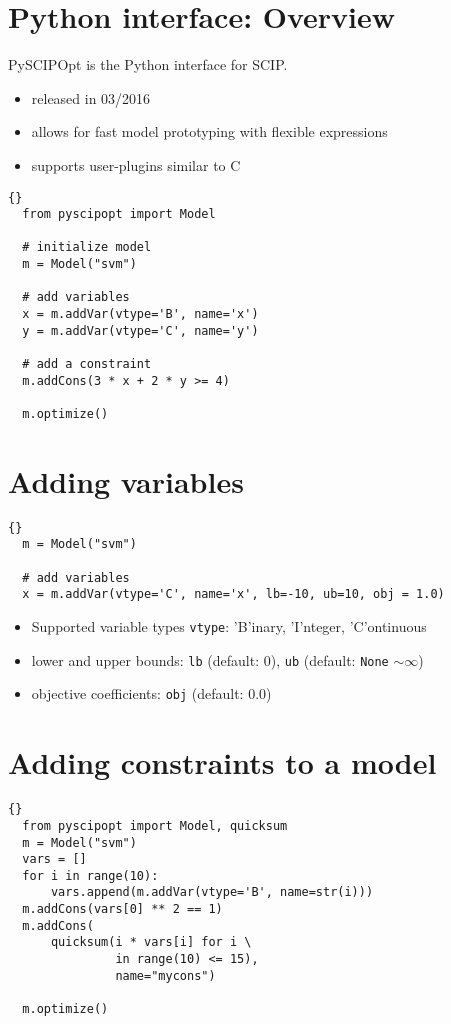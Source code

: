 \documentclass[10pt]{beamer}
\begin{document}
\section[fragile]{Python interface: Overview}

PySCIPOpt is the Python interface for SCIP.
\begin{itemize}
\item released in 03/2016
\item allows for fast model prototyping with flexible expressions
\item supports user-plugins similar to C
\end{itemize}

\begin{lstlisting}[frame=tb]{}
  from pyscipopt import Model

  # initialize model
  m = Model("svm")

  # add variables
  x = m.addVar(vtype='B', name='x')
  y = m.addVar(vtype='C', name='y')

  # add a constraint
  m.addCons(3 * x + 2 * y >= 4)

  m.optimize()
\end{lstlisting}

\section[fragile]{Adding variables}
  \begin{lstlisting}[frame=tb]{}
  m = Model("svm")

  # add variables
  x = m.addVar(vtype='C', name='x', lb=-10, ub=10, obj = 1.0)
  \end{lstlisting}

\begin{itemize}
\item Supported variable types \texttt{vtype}: 'B'inary, 'I'nteger, 'C'ontinuous
\item lower and upper bounds: \texttt{lb} (default: 0), \texttt{ub} (default: \texttt{None} $\sim \infty$)
\item objective coefficients: \texttt{obj} (default: $0.0$)
\end{itemize}



\section[fragile]{Adding constraints to a model}
\begin{lstlisting}[frame=tb]{}
  from pyscipopt import Model, quicksum
  m = Model("svm")
  vars = []
  for i in range(10):
      vars.append(m.addVar(vtype='B', name=str(i)))
  m.addCons(vars[0] ** 2 == 1)
  m.addCons(
      quicksum(i * vars[i] for i \
               in range(10) <= 15),
               name="mycons")

  m.optimize()
\end{lstlisting}
\end{document}
